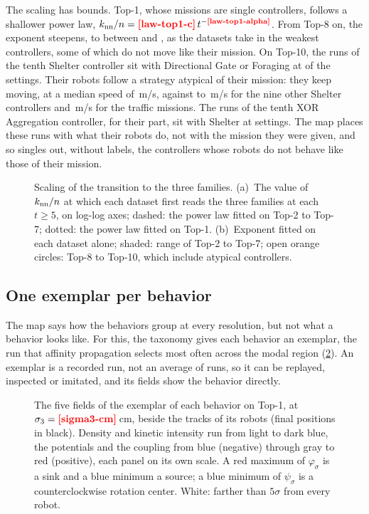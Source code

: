\documentclass[pdflatex,sn-apa]{sn-jnl}
\begin{document}
The scaling has bounds. Top-1, whose missions are single controllers, follows a shallower power law,
$\knn/n=\nm{law-top1-c}\,t^{-\nm{law-top1-alpha}}$. From Top-8 on, the exponent steepens, to between
 and , as the datasets take in the weakest controllers, some of which do
not move like their mission. On Top-10, the runs of the tenth Shelter controller sit with Directional Gate or Foraging
at  of the  settings. Their robots follow a strategy atypical of their mission: they keep
moving, at a median speed of
\,m/s, against  to \,m/s for the nine other
Shelter controllers and \,m/s for the traffic missions. The runs of the tenth XOR Aggregation
controller, for their part, sit with Shelter at  settings. The map places these runs with what
their robots do, not with the mission they were given, and so singles out, without labels, the controllers whose robots
do not behave like those of their mission.

\begin{figure}[!htb]
\centering
{}
\caption{Scaling of the transition to the three families. (a)~The value of $k_{\mathrm{nn}}/n$ at which each dataset first reads
the three families at each $t\geq5$, on log-log axes; dashed: the power law fitted on Top-2 to Top-7; dotted: the power
law fitted on Top-1. (b)~Exponent fitted on each dataset alone; shaded: range of Top-2 to Top-7; open orange circles:
Top-8 to Top-10, which include atypical controllers.}
\label{fig:law}
\end{figure}

\subsection{One exemplar per behavior}
\label{sec:res_exemplars}

The map says how the behaviors group at every resolution, but not what a behavior looks like. For this, the taxonomy gives each behavior an exemplar, the run that affinity propagation selects most often
across the modal region (\cref{fig:fields}). An exemplar is a recorded run, not an average of runs, so it can be replayed,
inspected or imitated, and its fields show the behavior directly.

\begin{figure}[!htb]
\centering
{}
\caption{The five fields of the exemplar of each behavior on Top-1, at $\sigma_3=\nm{sigma3-cm}$\,cm, beside the
tracks of its robots (final positions in black). Density and kinetic intensity run from light to dark blue, the
potentials and the coupling from blue (negative) through gray to red (positive), each panel on its own scale. A red
maximum of $\varphi_\sigma$ is a sink and a blue minimum a source; a blue minimum of $\psi_\sigma$ is a
counterclockwise rotation center. White: farther than $5\sigma$ from every robot.}
\label{fig:fields}
\end{figure}
\end{document}
